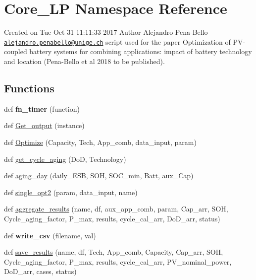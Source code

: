 \hypertarget{namespace_core___l_p}{}\section{Core\+\_\+\+LP Namespace Reference}
\label{namespace_core___l_p}


Created on Tue Oct 31 11\+:11\+:33 2017 Author Alejandro Pena-\/\+Bello \href{mailto:alejandro.penabello@unige.ch}{\tt alejandro.\+penabello@unige.\+ch} script used for the paper Optimization of P\+V-\/coupled battery systems for combining applications\+: impact of battery technology and location (Pena-\/\+Bello et al 2018 to be published).  


\subsection*{Functions}
\begin{DoxyCompactItemize}
\item 
\mbox{\label{namespace_core___l_p_addd3013e86c01fb4e5f2e614a63fb88f}} 
def {\bfseries fn\+\_\+timer} (function)
\item 
def \mbox{\hyperlink{namespace_core___l_p_a6d35392ffd5384b704752a0442ad2332}{Get\+\_\+output}} (instance)
\item 
def \mbox{\hyperlink{namespace_core___l_p_a768caa5498af6ac8dbc012a3198f704b}{Optimize}} (Capacity, Tech, App\+\_\+comb, data\+\_\+input, param)
\item 
def \mbox{\hyperlink{namespace_core___l_p_a90d03e131848066a67ee156ba403f3c2}{get\+\_\+cycle\+\_\+aging}} (DoD, Technology)
\item 
def \mbox{\hyperlink{namespace_core___l_p_ae2add554ee7eb6419d9ec5e4fa2c7b96}{aging\+\_\+day}} (daily\+\_\+\+E\+SB, S\+OH, S\+O\+C\+\_\+min, Batt, aux\+\_\+\+Cap)
\item 
def \mbox{\hyperlink{namespace_core___l_p_aac48b8438d780ef78c7c7024106d0273}{single\+\_\+opt2}} (param, data\+\_\+input, name)
\item 
def \mbox{\hyperlink{namespace_core___l_p_abf5153d05010f3e1a44886d3e54ebfc0}{aggregate\+\_\+results}} (name, df, aux\+\_\+app\+\_\+comb, param, Cap\+\_\+arr, S\+OH, Cycle\+\_\+aging\+\_\+factor, P\+\_\+max, results, cycle\+\_\+cal\+\_\+arr, Do\+D\+\_\+arr, status)
\item 
\mbox{\label{namespace_core___l_p_a8843e95d0aa1b35845d33db1ae53ca0e}} 
def {\bfseries write\+\_\+csv} (filename, val)
\item 
def \mbox{\hyperlink{namespace_core___l_p_aca557201a95921203db9daff85af5445}{save\+\_\+results}} (name, df, Tech, App\+\_\+comb, Capacity, Cap\+\_\+arr, S\+OH, Cycle\+\_\+aging\+\_\+factor, P\+\_\+max, results, cycle\+\_\+cal\+\_\+arr, P\+V\+\_\+nominal\+\_\+power, Do\+D\+\_\+arr, cases, status)
\end{DoxyCompactItemize}


